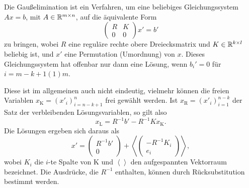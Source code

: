 \section{}

Die Gaußelimination ist ein Verfahren, um eine beliebiges
Gleichungssystem $Ax=b$, mit $A\in\mathbb{R}^{m\times n}$, auf die
äquivalente Form
\begin{equation}
  \label{eq:rform}
  \begin{pmatrix}
    R & K \\
    0 & 0
  \end{pmatrix} x' = b'
\end{equation}
zu bringen, wobei $R$ eine reguläre rechte obere Dreiecksmatrix und
$K\in\mathbb{R}^{k\times l}$ beliebig ist, und $x'$ eine Permutation
(Umordnung) von $x$. Dieses Gleichungssystem hat offenbar nur dann
eine Lösung, wenn $b_i'=0$ für $i=m-k+1(1)m$.

Diese ist im allgemeinen auch nicht eindeutig, vielmehr können die
freien Variablen $x_\text{K} = (x'_i)_{i=n-k+1}^{n}$ frei gewählt
werden. Ist $x_\text{R} = (x'_i)_{i=1}^{n-k}$ der Satz der
verbleibenden Lösungsvariablen, so gilt also
\begin{equation*}
  x_\text{L} = R^{-1}b' - R^{-1}K x_\text{K}.
\end{equation*}
Die Lösungen ergeben sich daraus als
\begin{equation}
  x' =
  \begin{pmatrix}
    R^{-1}b'\\
    0
  \end{pmatrix} +
  \left<
    \begin{pmatrix}
      -R^{-1}K_i\\
      e_i
    \end{pmatrix}
  \right>,
\end{equation}
wobei $K_i$ die $i$-te Spalte von K und
$\left<\right>$ den aufgespannten Vektorraum bezeichnet. Die
Ausdrücke, die $R^{-1}$ enthalten, können durch Rücksubstitution bestimmt
werden.

